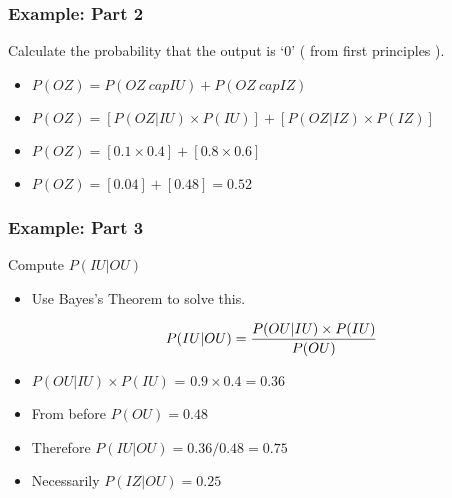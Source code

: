 \begin{frame}
\frametitle{Example: Part 2}
Calculate the probability that the output is `0' ( from first principles ).
\begin{itemize}
\item $P(OZ) = P(OZ \ cap IU) + P(OZ \ cap IZ)$

\item $P(OZ) = [P(OZ|IU) \times P(IU) ] + [P(OZ|IZ) \times P(IZ) ]$

\item $P(OZ) = [0.1 \times 0.4 ] + [0.8 \times 0.6 ]$

\item $P(OZ) = [0.04] + [0.48] = \boldsymbol{0.52}$
\end{itemize}

\end{frame}
\begin{frame}
\frametitle{Example: Part 3}
Compute $P(IU|OU)$ 

\begin{itemize}
\item Use Bayes's Theorem to solve this.

\[P(IU|OU) = { P(OU|IU) \times P(IU)\over P(OU) } \]

\item $P(OU|IU)\times P(IU)$ = $0.9 \times 0.4 = 0.36$
\item From before $P(OU) = 0.48$
\item Therefore $P(IU|OU) = 0.36 / 0.48 = \boldsymbol{0.75}$
\item Necessarily $P(IZ|OU)  = 0.25$
\end{itemize}

\end{frame}

